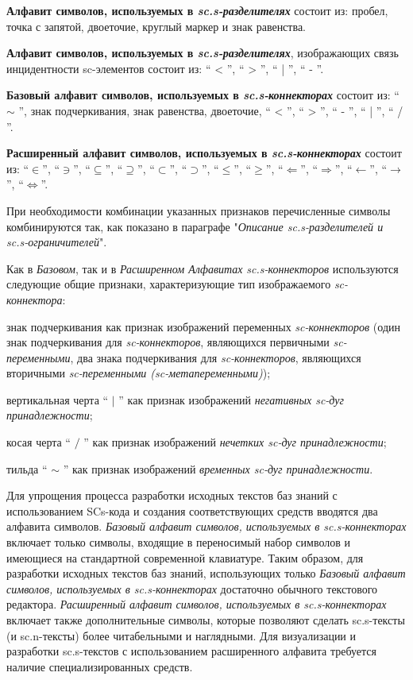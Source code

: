 \textbf{Алфавит символов, используемых в \textit{sc.s-разделителях}} состоит из: пробел, точка с запятой, двоеточие, круглый маркер и знак равенства.

\textbf{Алфавит символов, используемых в \textit{sc.s-разделителях}}, изображающих связь инцидентности sc-элементов состоит из: `` < ''{}, `` > ''{}, `` | ''{}, `` - ''{}.

\textbf{Базовый алфавит символов, используемых в \textit{sc.s-коннекторах}} состоит из: `` $\sim$ ''{}, знак подчеркивания, знак равенства, двоеточие, `` < ''{}, `` > ''{}, `` - ''{}, `` | ''{}, `` / ''{}.
	
\textbf{Расширенный алфавит символов, используемых в \textit{sc.s-коннекторах}} состоит из:
	``$\in$''{}, 
	``$\ni$''{}, ``$\subseteq$''{}, ``$\supseteq$''{},   ``$\subset$''{}, ``$\supset$''{}, ``$\leq$''{},  ``$\geq$''{}, ``$\Leftarrow$''{}, ``$\Rightarrow$''{}, ``$\leftarrow$''{}, ``$\rightarrow$''{}, 
	``$\Leftrightarrow$''{}.


При необходимости комбинации указанных признаков перечисленные символы комбинируются так, как показано в параграфе "\textit{Описание sc.s-разделителей и sc.s-ограничителей}"{}.

 Как в \textit{Базовом}, так и в \textit{Расширенном Алфавитах} \textit{sc.s-коннекторов} используются следующие общие признаки, характеризующие тип изображаемого \textit{sc-коннектора}:
\begin{textitemize}
	\item знак подчеркивания как признак изображений переменных \textit{sc-коннекторов} (один знак подчеркивания для \textit{sc-коннекторов}, являющихся первичными \textit{sc-переменными}, два знака подчеркивания для \textit{sc-коннекторов}, являющихся вторичными \textit{sc-переменными (sc-метапеременными)});
	\item вертикальная черта `` $ | $ ''{} как признак изображений \textit{негативных sc-дуг принадлежности}; 
	\item косая черта `` $ / $ ''{} как признак изображений \textit{нечетких sc-дуг принадлежности};
	\item тильда `` $ \sim $ ''{} как признак изображений \textit{временных sc-дуг принадлежности}.   
\end{textitemize}

Для упрощения процесса разработки исходных текстов баз знаний с использованием SCs-кода и создания соответствующих средств вводятся два алфавита символов. \textit{Базовый алфавит символов, используемых в sc.s-коннекторах} включает только символы, входящие в переносимый набор символов и имеющиеся на стандартной современной клавиатуре. Таким образом, для разработки исходных текстов баз знаний, использующих только \textit{Базовый алфавит символов, используемых в sc.s-коннекторах} достаточно обычного текстового редактора. \textit{Расширенный алфавит символов, используемых в sc.s-коннекторах} включает также дополнительные символы, которые позволяют сделать sc.s-тексты (и sc.n-тексты) более читабельными и наглядными. Для визуализации и разработки sc.s-текстов с использованием расширенного алфавита требуется наличие специализированных средств.


